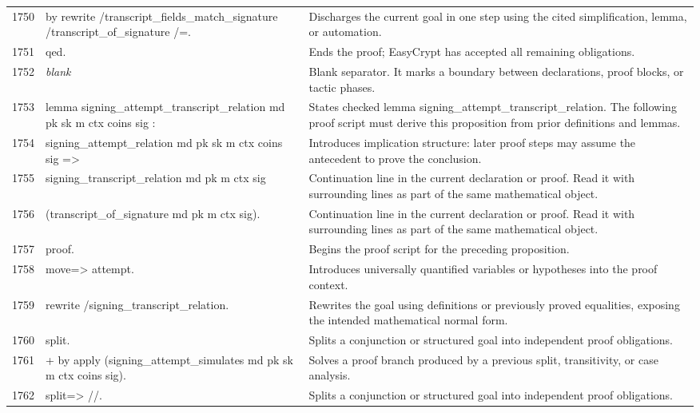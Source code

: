 \documentclass[10pt]{article}
\begin{document}
\begin{longtable}{r L{0.53\textwidth} L{0.37\textwidth}}
1750 & {\ttfamily\scriptsize by rewrite /transcript\_fields\_match\_signature /transcript\_of\_signature /=.} & Discharges the current goal in one step using the cited simplification, lemma, or automation. \\
1751 & {\ttfamily\scriptsize qed.} & Ends the proof; EasyCrypt has accepted all remaining obligations. \\
1752 & {\ttfamily\scriptsize \emph{blank}} & Blank separator.  It marks a boundary between declarations, proof blocks, or tactic phases. \\
1753 & {\ttfamily\scriptsize lemma signing\_attempt\_transcript\_relation md pk sk m ctx coins sig :} & States checked lemma signing\_attempt\_transcript\_relation.  The following proof script must derive this proposition from prior definitions and lemmas. \\
1754 & {\ttfamily\scriptsize   signing\_attempt\_relation md pk sk m ctx coins sig =>} & Introduces implication structure: later proof steps may assume the antecedent to prove the conclusion. \\
1755 & {\ttfamily\scriptsize   signing\_transcript\_relation md pk m ctx sig} & Continuation line in the current declaration or proof.  Read it with surrounding lines as part of the same mathematical object. \\
1756 & {\ttfamily\scriptsize     (transcript\_of\_signature md pk m ctx sig).} & Continuation line in the current declaration or proof.  Read it with surrounding lines as part of the same mathematical object. \\
1757 & {\ttfamily\scriptsize proof.} & Begins the proof script for the preceding proposition. \\
1758 & {\ttfamily\scriptsize move=> attempt.} & Introduces universally quantified variables or hypotheses into the proof context. \\
1759 & {\ttfamily\scriptsize rewrite /signing\_transcript\_relation.} & Rewrites the goal using definitions or previously proved equalities, exposing the intended mathematical normal form. \\
1760 & {\ttfamily\scriptsize split.} & Splits a conjunction or structured goal into independent proof obligations. \\
1761 & {\ttfamily\scriptsize + by apply (signing\_attempt\_simulates md pk sk m ctx coins sig).} & Solves a proof branch produced by a previous split, transitivity, or case analysis. \\
1762 & {\ttfamily\scriptsize split=> //.} & Splits a conjunction or structured goal into independent proof obligations. \\

\end{longtable}
\end{document}
